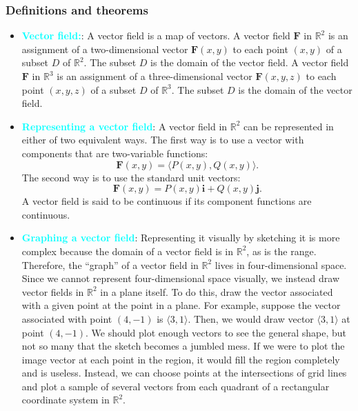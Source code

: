 \documentclass{report}
\begin{document}
    \subsubsection{Definitions and theorems}
    \begin{itemize}
        \item \textbf{\textcolor{cyan}{Vector field:}}:  A vector field is a map of vectors.
            \bigbreak \noindent 
            A vector field $\mathbf{F}$ in $\mathbb{R}^2$ is an assignment of a two-dimensional vector $\mathbf{F}(x,y)$ to each point $(x,y)$ of a subset $D$ of $\mathbb{R}^2$. The subset $D$ is the domain of the vector field.
            \bigbreak \noindent 
            A vector field $\mathbf{F}$ in $\mathbb{R}^3$ is an assignment of a three-dimensional vector $\mathbf{F}(x,y,z)$ to each point $(x,y,z)$ of a subset $D$ of $\mathbb{R}^3$. The subset $D$ is the domain of the vector field.
        \item \textbf{\textcolor{cyan}{Representing a vector field}}:
            A vector field in $\mathbb{R}^2$ can be represented in either of two equivalent ways. The first way is to use a vector with components that are two-variable functions:
            \[
                \mathbf{F}(x,y) = \langle P(x,y), Q(x,y) \rangle.
            \]
            The second way is to use the standard unit vectors:
            \[
                \mathbf{F}(x,y) = P(x,y)\mathbf{i} + Q(x,y)\mathbf{j}.
            \]
            A vector field is said to be continuous if its component functions are continuous.
        \item \textbf{\textcolor{cyan}{Graphing a vector field}}:
            Representing it visually by sketching it is more complex because the domain of a vector field is in $\mathbb{R}^2$, as is the range. Therefore, the “graph” of a vector field in $\mathbb{R}^2$ lives in four-dimensional space. Since we cannot represent four-dimensional space visually, we instead draw vector fields in $\mathbb{R}^2$ in a plane itself. To do this, draw the vector associated with a given point at the point in a plane. For example, suppose the vector associated with point $(4,-1)$ is $\langle 3,1 \rangle$. Then, we would draw vector $\langle 3,1 \rangle$ at point $(4,-1)$.
            \bigbreak \noindent 
            We should plot enough vectors to see the general shape, but not so many that the sketch becomes a jumbled mess. If we were to plot the image vector at each point in the region, it would fill the region completely and is useless. Instead, we can choose points at the intersections of grid lines and plot a sample of several vectors from each quadrant of a rectangular coordinate system in $\mathbb{R}^2$.

\end{itemize}
\end{document}
